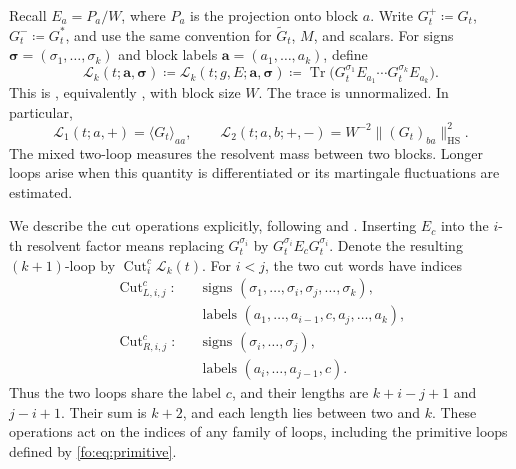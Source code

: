 \documentclass[11pt]{article}
\numberwithin{equation}{section}
\theoremstyle{remark}
\newcommand{\Tr}{\operatorname{Tr}}
\newcommand{\wt}{\widetilde}
\newcommand{\cL}{\mathcal L}
\newcommand{\HS}{\mathrm{HS}}
\begin{document}
Recall \(E_a=P_a/W\), where \(P_a\) is the projection onto block
\(a\). Write \(G_t^+\coloneqq G_t\), \(G_t^-\coloneqq G_t^*\), and use the same
convention for $\wt G_t$, $M$, and scalars. For signs
\(\boldsymbol\sigma=(\sigma_1,\ldots,\sigma_k)\) and block labels
\(\boldsymbol a=(a_1,\ldots,a_k)\), define
\begin{equation}\label{fo:eq:loops}
 \cL_k(t;\boldsymbol a,\boldsymbol\sigma)
 \coloneqq\cL_k(t;g,E;\boldsymbol a,\boldsymbol\sigma)
 \coloneqq \Tr\bigl(G_t^{\sigma_1}E_{a_1}\cdots
                 G_t^{\sigma_k}E_{a_k}\bigr).
\end{equation}
This is \cite[Definition~3.4, (3.16)--(3.19)]{TYY},
equivalently \cite[Definition~2.9]{YY}, with block size $W$.
The trace is unnormalized. In particular,
\[
 \cL_1(t;a,+)=\langle G_t\rangle_{aa},\qquad
 \cL_2(t;a,b;+,-)=W^{-2}\|(G_t)_{ba}\|_{\HS}^2.
\]
The mixed two-loop measures the resolvent mass between two blocks.
Longer loops arise when this quantity is differentiated or its
martingale fluctuations are estimated.

We describe the cut operations explicitly, following
\cite[Definition~3.5, (3.20)--(3.22)]{TYY} and
\cite[Definition~2.10]{YY}. Inserting \(E_c\) into the \(i\)-th
resolvent factor means replacing
\(G_t^{\sigma_i}\) by \(G_t^{\sigma_i}E_cG_t^{\sigma_i}\).
Denote the resulting \((k+1)\)-loop by
\(\operatorname{Cut}_i^c\cL_k(t)\).
For \(i<j\), the two cut words have indices
\begin{equation}\label{fo:eq:cuts}
\begin{aligned}
 \operatorname{Cut}_{L,i,j}^c:\quad
 &\text{signs }(\sigma_1,\ldots,\sigma_i,\sigma_j,\ldots,\sigma_k),\\
 &\text{labels }(a_1,\ldots,a_{i-1},c,a_j,\ldots,a_k),\\
 \operatorname{Cut}_{R,i,j}^c:\quad
 &\text{signs }(\sigma_i,\ldots,\sigma_j),\\
 &\text{labels }(a_i,\ldots,a_{j-1},c).
 \end{aligned}
\end{equation}
Thus the two loops share the label \(c\), and their lengths are
\(k+i-j+1\) and \(j-i+1\). Their sum is \(k+2\), and each length
lies between two and \(k\). These operations act on the indices of
any family of loops, including the primitive loops defined by
\eqref{fo:eq:primitive}.
\end{document}
